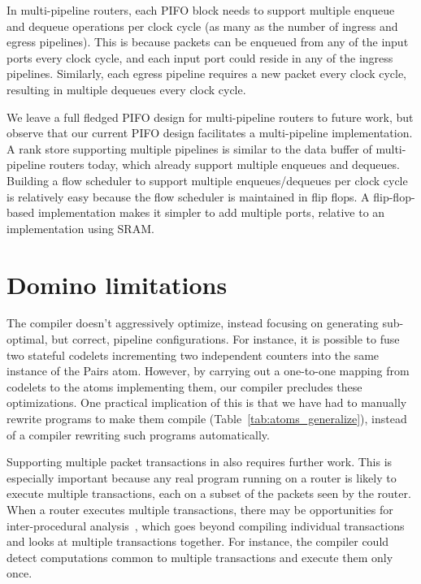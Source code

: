 In multi-pipeline routers, each PIFO block needs to support multiple enqueue
and dequeue operations per clock cycle (as many as the number of ingress and
egress pipelines). This is because packets can be enqueued from any of the
input ports every clock cycle, and each input port could reside in any of the
ingress pipelines. Similarly, each egress pipeline requires a new packet every
clock cycle, resulting in multiple dequeues every clock cycle.

We leave a full fledged PIFO design for multi-pipeline routers to future work,
but observe that our current PIFO design facilitates a multi-pipeline
implementation.  A rank store supporting multiple pipelines is similar to the
data buffer of multi-pipeline routers today, which already support multiple
enqueues and dequeues. Building a flow scheduler to support multiple
enqueues/dequeues per clock cycle is relatively easy because the flow scheduler
is maintained in flip flops. A flip-flop-based implementation makes it simpler
to add multiple ports, relative to an implementation using SRAM.

\section{Domino limitations}
\label{sec:domino_limitations}
The \pktlanguage compiler doesn't aggressively optimize, instead focusing on
generating sub-optimal, but correct, pipeline configurations. For instance, it
is possible to fuse two stateful codelets incrementing two independent counters
into the same instance of the Pairs atom. However, by carrying out a one-to-one
mapping from codelets to the atoms implementing them, our compiler precludes
these optimizations. One practical implication of this is that we have had to
manually rewrite programs to make them compile
(Table~\ref{tab:atoms_generalize}), instead of a compiler rewriting such
programs automatically.

Supporting multiple packet transactions in \pktlanguage also requires further
work. This is especially important because any real program running on a router
is likely to execute multiple transactions, each on a subset of the packets
seen by the router. When a router executes multiple transactions, there may be
opportunities for inter-procedural analysis~\cite{dragonbook}, which goes
beyond compiling individual transactions and looks at multiple transactions
together.  For instance, the compiler could detect computations common to
multiple transactions and execute them only once.

